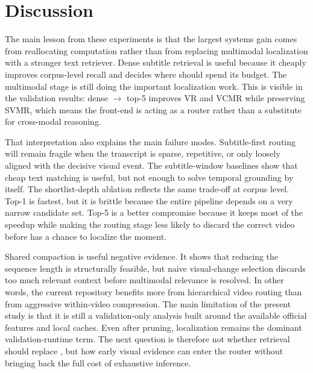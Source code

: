\section{Discussion}
\label{sec:discussion}

The main lesson from these experiments is that the largest systems gain comes from reallocating computation rather than from replacing multimodal localization with a stronger text retriever. Dense subtitle retrieval is useful because it cheaply improves corpus-level recall and decides where \xml should spend its budget. The multimodal stage is still doing the important localization work. This is visible in the validation results: dense $\rightarrow$ \xml top-5 improves VR and VCMR while preserving SVMR, which means the front-end is acting as a router rather than a substitute for cross-modal reasoning.

That interpretation also explains the main failure modes. Subtitle-first routing will remain fragile when the transcript is sparse, repetitive, or only loosely aligned with the decisive visual event. The subtitle-window baselines show that cheap text matching is useful, but not enough to solve temporal grounding by itself. The shortlist-depth ablation reflects the same trade-off at corpus level. Top-1 is fastest, but it is brittle because the entire pipeline depends on a very narrow candidate set. Top-5 is a better compromise because it keeps most of the speedup while making the routing stage less likely to discard the correct video before \xml has a chance to localize the moment.

Shared compaction is useful negative evidence. It shows that reducing the \xml sequence length is structurally feasible, but naive visual-change selection discards too much relevant context before multimodal relevance is resolved. In other words, the current repository benefits more from hierarchical video routing than from aggressive within-video compression. The main limitation of the present study is that it is still a validation-only analysis built around the available official features and local caches. Even after pruning, \xml localization remains the dominant validation-runtime term. The next question is therefore not whether retrieval should replace \xml, but how early visual evidence can enter the router without bringing back the full cost of exhaustive \xml inference.
